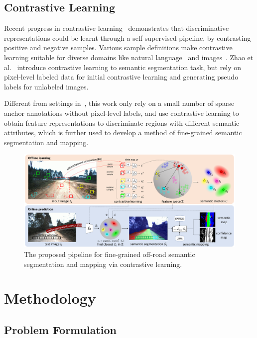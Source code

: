 \documentclass[letterpaper, 10 pt, conference]{ieeeconf}  %
\begin{document}
\subsection{Contrastive Learning}
Recent progress in contrastive learning~\cite{oord2018CPC}\cite{chen2020simple}\cite{he2020momentum} demonstrates that discriminative representations could be learnt through a self-supervised pipeline, by contrasting positive and negative samples. Various sample definitions make contrastive learning suitable for diverse domains like natural language~\cite{oord2018CPC} and images~\cite{tian2019contrastive}. 
Zhao et al.~\cite{zhao2020contrastive} introduce contrastive learning to semantic segmentation task, but rely on pixel-level labeled data for initial contrastive learning and generating pseudo labels for unlabeled images.

Different from settings in~\cite{zhao2020contrastive}, this work only rely on a small number of sparse anchor annotations without pixel-level labels, and use contrastive learning to obtain feature representations to discriminate regions with different semantic attributes, which is further used to develop a method of fine-grained semantic segmentation and mapping.

\begin{figure}[]
	\centering
	\includegraphics[width=\textwidth]{pipeline.pdf}
	\caption{The proposed pipeline for fine-grained off-road semantic segmentation and mapping via contrastive learning.}
	\label{fig:pipeline}
\end{figure}

\section{Methodology} \label{methodology}

\subsection{Problem Formulation}
\end{document}
